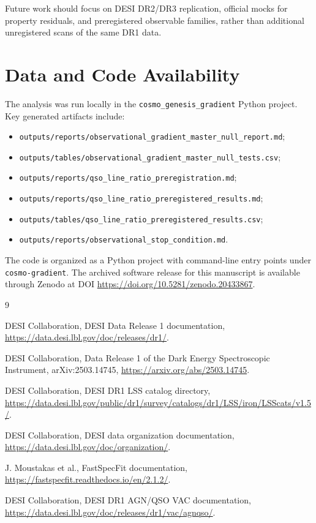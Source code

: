 \documentclass[11pt]{article}
\begin{document}
Future work should focus on DESI DR2/DR3 replication, official mocks for property residuals, and preregistered observable families, rather than additional unregistered scans of the same DR1 data.

\section*{Data and Code Availability}

The analysis was run locally in the \texttt{cosmo\_genesis\_gradient} Python project. Key generated artifacts include:
\begin{itemize}
    \item \texttt{outputs/reports/observational\_gradient\_master\_null\_report.md};
    \item \texttt{outputs/tables/observational\_gradient\_master\_null\_tests.csv};
    \item \texttt{outputs/reports/qso\_line\_ratio\_preregistration.md};
    \item \texttt{outputs/reports/qso\_line\_ratio\_preregistered\_results.md};
    \item \texttt{outputs/tables/qso\_line\_ratio\_preregistered\_results.csv};
    \item \texttt{outputs/reports/observational\_stop\_condition.md}.
\end{itemize}

The code is organized as a Python project with command-line entry points under \texttt{cosmo-gradient}. The archived software release for this manuscript is available through Zenodo at DOI \url{https://doi.org/10.5281/zenodo.20433867}.

\begin{thebibliography}{9}

DESI Collaboration,
\newblock DESI Data Release 1 documentation,
\newblock \url{https://data.desi.lbl.gov/doc/releases/dr1/}.

DESI Collaboration,
\newblock Data Release 1 of the Dark Energy Spectroscopic Instrument,
\newblock arXiv:2503.14745,
\newblock \url{https://arxiv.org/abs/2503.14745}.

DESI Collaboration,
\newblock DESI DR1 LSS catalog directory,
\newblock \url{https://data.desi.lbl.gov/public/dr1/survey/catalogs/dr1/LSS/iron/LSScats/v1.5/}.

DESI Collaboration,
\newblock DESI data organization documentation,
\newblock \url{https://data.desi.lbl.gov/doc/organization/}.

J. Moustakas et al.,
\newblock FastSpecFit documentation,
\newblock \url{https://fastspecfit.readthedocs.io/en/2.1.2/}.

DESI Collaboration,
\newblock DESI DR1 AGN/QSO VAC documentation,
\newblock \url{https://data.desi.lbl.gov/doc/releases/dr1/vac/agnqso/}.

\end{thebibliography}
\end{document}
